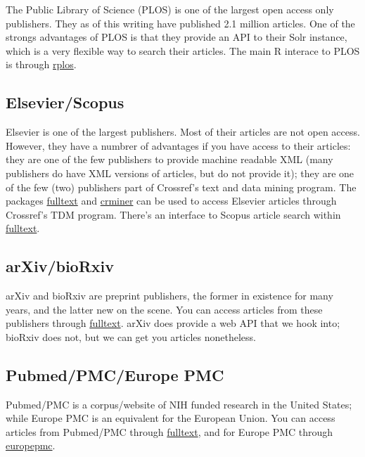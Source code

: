 \documentclass[author-year, review, 11pt]{components/elsarticle} %
\begin{document}
The Public Library of Science (PLOS) is one of the largest open access
only publishers. They as of this writing have published 2.1 million
articles. One of the strongs advantages of PLOS is that they provide an
API to their Solr instance, which is a very flexible way to search their
articles. The main R interace to PLOS is through
\href{https://github.com/ropensci/rplos}{rplos}.

\hypertarget{elsevierscopus}{%
\subsection{Elsevier/Scopus}\label{elsevierscopus}}

Elsevier is one of the largest publishers. Most of their articles are
not open access. However, they have a numbrer of advantages if you have
access to their articles: they are one of the few publishers to provide
machine readable XML (many publishers do have XML versions of articles,
but do not provide it); they are one of the few (two) publishers part of
Crossref's text and data mining program. The packages
\href{https://github.com/ropensci/fulltext}{fulltext} and
\href{https://github.com/ropensci/crminer}{crminer} can be used to
access Elsevier articles through Crossref's TDM program. There's an
interface to Scopus article search within
\href{https://github.com/ropensci/fulltext}{fulltext}.

\hypertarget{arxivbiorxiv}{%
\subsection{arXiv/bioRxiv}\label{arxivbiorxiv}}

arXiv and bioRxiv are preprint publishers, the former in existence for
many years, and the latter new on the scene. You can access articles
from these publishers through
\href{https://github.com/ropensci/fulltext}{fulltext}. arXiv does
provide a web API that we hook into; bioRxiv does not, but we can get
you articles nonetheless.

\hypertarget{pubmedpmceurope-pmc}{%
\subsection{Pubmed/PMC/Europe PMC}\label{pubmedpmceurope-pmc}}

Pubmed/PMC is a corpus/website of NIH funded research in the United
States; while Europe PMC is an equivalent for the European Union. You
can access articles from Pubmed/PMC through
\href{https://github.com/ropensci/fulltext}{fulltext}, and for Europe
PMC through \href{https://github.com/ropensci/europepmc}{europepmc}.
\end{document}
